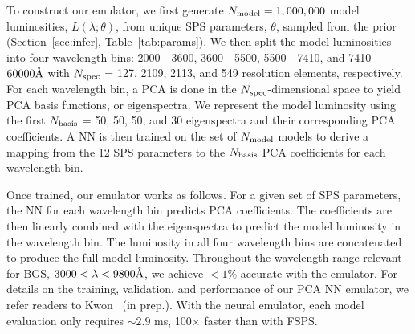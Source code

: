 
To construct our emulator, we first generate $N_{\rm model} = 1,000,000$
model luminosities, $L(\lambda;\theta)$, from unique SPS parameters,
$\theta$, sampled from the prior (Section~\ref{sec:infer},
Table~\ref{tab:params}).
We then split the model luminosities into four wavelength bins: 2000 - 3600,
3600 - 5500, 5500 - 7410, and 7410 - $60000\AA$ with $N_{\rm spec}$ = 127, 2109,
2113, and 549 resolution elements, respectively.
For each wavelength bin, a PCA is done in the $N_{\rm spec}$-dimensional
space to yield PCA basis functions, or eigenspectra. 
We represent the model luminosity using the first $N_{\rm basis}$ = 50, 50, 50, and 30
eigenspectra and their corresponding PCA coefficients. 
A NN is then trained on the set of $N_{\rm model}$ models to
derive a mapping from the 12 SPS parameters to the $N_{\rm basis}$ PCA
coefficients for each wavelength bin. 


Once trained, our emulator works as follows.
For a given set of SPS parameters, the NN for each wavelength bin predicts
PCA coefficients. 
The coefficients are then linearly combined with the eigenspectra to
predict the model luminosity in the wavelength bin. 
The luminosity in all four wavelength bins are concatenated to produce the
full model luminosity. 
Throughout the wavelength range relevant for BGS, $3000 < \lambda < 9800\AA$,
we achieve $< 1\%$ accurate with the emulator. 
For details on the training, validation, and performance of our PCA NN
emulator, we refer readers to Kwon \etal~(in prep.). 
With the neural emulator, each model evaluation only requires ${\sim}2.9$ ms,
100$\times$ faster than with FSPS.


